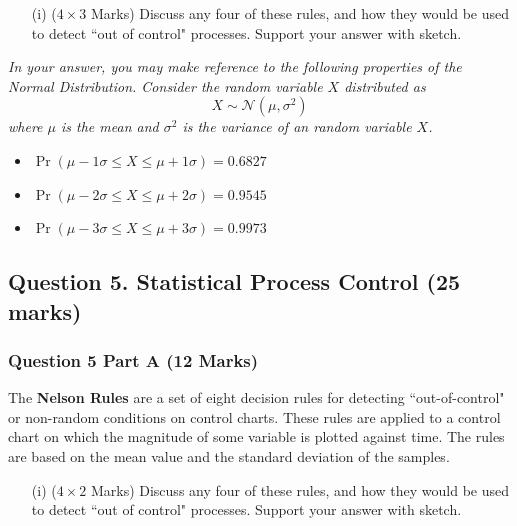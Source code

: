 \documentclass[a4paper,12pt]{article}
\begin{document}
\begin{itemize}
	\item[(i)] ($4 \times 3$ Marks) Discuss any four of these rules, and how they would be used to detect ``out of control" processes. Support your answer with sketch.
\end{itemize}

\bigskip 
\begin{framed}
	\noindent \textit{In your answer, you may make reference to the following properties of the Normal Distribution. Consider the random variable $X$ distributed as
		\[X \sim \mathcal{N}(\mu,\sigma^2)\]
		where $\mu$ is the mean and $\sigma^2$ is the variance of an random variable $X$.}
	\begin{itemize}
		\item $\Pr( \mu - 1\sigma \leq X \leq \mu + 1\sigma ) = 0.6827$
		\item $\Pr( \mu - 2\sigma \leq X \leq \mu + 2\sigma ) = 0.9545$
		\item $\Pr( \mu - 3\sigma \leq X \leq \mu + 3\sigma )= 0.9973$
		
	\end{itemize}
\end{framed}
\newpage



\subsection*{Question 5. Statistical Process Control (25 marks) }

\subsubsection*{Question 5 Part A (12 Marks)}
The \textbf{Nelson Rules} are a set of eight decision rules for detecting ``out-of-control" or non-random conditions on control charts. These rules are applied to a control chart on which the magnitude of some variable is plotted against time. The rules are based on the mean value and the standard deviation of the samples.\\

\begin{itemize}
	\item[(i)] ($4 \times 2$ Marks) Discuss any four of these rules, and how they would be used to detect ``out of control" processes. Support your answer with sketch.
\end{itemize}
\end{document}
